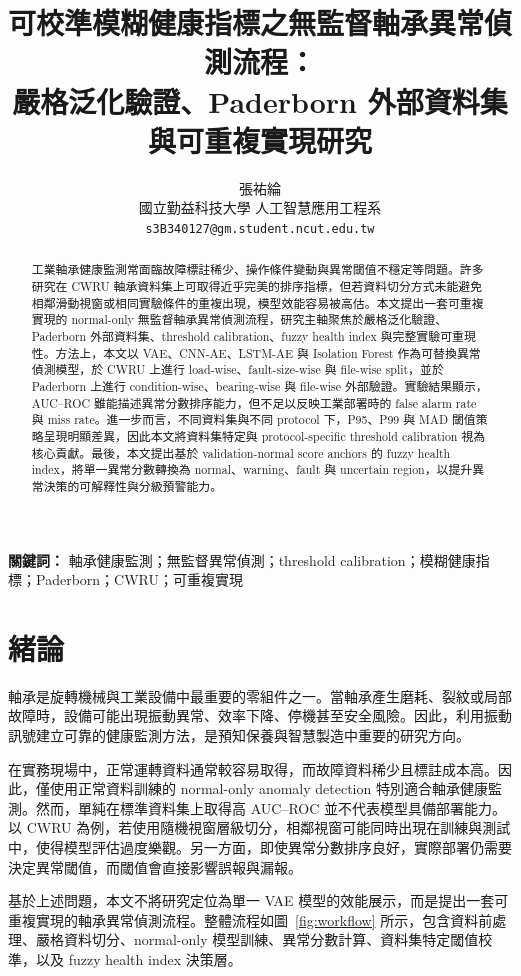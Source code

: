 \documentclass[12pt,a4paper]{article}
\title{可校準模糊健康指標之無監督軸承異常偵測流程：\\嚴格泛化驗證、Paderborn 外部資料集與可重複實現研究}
\author{張祐綸\\國立勤益科技大學 人工智慧應用工程系\\\texttt{s3B340127@gm.student.ncut.edu.tw}}
\date{}
\newcommand{\aucroc}{AUC--ROC}
\begin{document}
\maketitle

\begin{abstract}
工業軸承健康監測常面臨故障標註稀少、操作條件變動與異常閾值不穩定等問題。許多研究在 CWRU 軸承資料集上可取得近乎完美的排序指標，但若資料切分方式未能避免相鄰滑動視窗或相同實驗條件的重複出現，模型效能容易被高估。本文提出一套可重複實現的 normal-only 無監督軸承異常偵測流程，研究主軸聚焦於嚴格泛化驗證、Paderborn 外部資料集、threshold calibration、fuzzy health index 與完整實驗可重現性。方法上，本文以 VAE、CNN-AE、LSTM-AE 與 Isolation Forest 作為可替換異常偵測模型，於 CWRU 上進行 load-wise、fault-size-wise 與 file-wise split，並於 Paderborn 上進行 condition-wise、bearing-wise 與 file-wise 外部驗證。實驗結果顯示，\aucroc{} 雖能描述異常分數排序能力，但不足以反映工業部署時的 false alarm rate 與 miss rate。進一步而言，不同資料集與不同 protocol 下，P95、P99 與 MAD 閾值策略呈現明顯差異，因此本文將資料集特定與 protocol-specific threshold calibration 視為核心貢獻。最後，本文提出基於 validation-normal score anchors 的 fuzzy health index，將單一異常分數轉換為 normal、warning、fault 與 uncertain region，以提升異常決策的可解釋性與分級預警能力。
\end{abstract}

\noindent\textbf{關鍵詞：} 軸承健康監測；無監督異常偵測；threshold calibration；模糊健康指標；Paderborn；CWRU；可重複實現

\section{緒論}

軸承是旋轉機械與工業設備中最重要的零組件之一。當軸承產生磨耗、裂紋或局部故障時，設備可能出現振動異常、效率下降、停機甚至安全風險。因此，利用振動訊號建立可靠的健康監測方法，是預知保養與智慧製造中重要的研究方向。

在實務現場中，正常運轉資料通常較容易取得，而故障資料稀少且標註成本高。因此，僅使用正常資料訓練的 normal-only anomaly detection 特別適合軸承健康監測。然而，單純在標準資料集上取得高 \aucroc{} 並不代表模型具備部署能力。以 CWRU 為例，若使用隨機視窗層級切分，相鄰視窗可能同時出現在訓練與測試中，使得模型評估過度樂觀。另一方面，即使異常分數排序良好，實際部署仍需要決定異常閾值，而閾值會直接影響誤報與漏報。

基於上述問題，本文不將研究定位為單一 VAE 模型的效能展示，而是提出一套可重複實現的軸承異常偵測流程。整體流程如圖~\ref{fig:workflow} 所示，包含資料前處理、嚴格資料切分、normal-only 模型訓練、異常分數計算、資料集特定閾值校準，以及 fuzzy health index 決策層。
\end{document}
